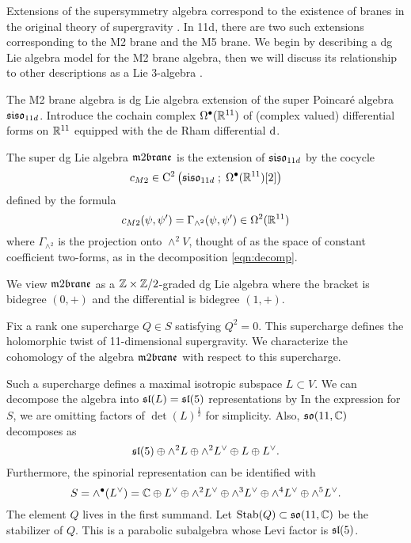 \documentclass[11pt]{amsart}
\begin{document}
Extensions of the supersymmetry algebra correspond to the existence of branes in the original theory of supergravity . 
In 11d, there are two such extensions corresponding to the M2 brane and the M5 brane.
We begin by describing a dg Lie algebra model for the M2 brane algebra, then we will discuss its relationship to other descriptions as a Lie 3-algebra \cite{Basu_2005,Bagger_2007,fiorenza2015super}. 

The M2 brane algebra is dg Lie algebra extension of the super Poincar\'e algebra $\mathfrak{siso}_{11d}$.
Introduce the cochain complex $\Omega^{\bullet}(\mathbb R^{11})$ of (complex valued) differential forms on $\mathbb R^{11}$ equipped with the de Rham differential ${\rm d}$.  
 
The super dg Lie algebra $\m2$ is the extension of $\mathfrak{siso}_{11d}$ by the cocycle
  \[
    c_{M2} \in {\rm C}^2\left(\mathfrak{siso}_{11d} \; ; \; \Omega^\bullet (\mathbb R^{11})[2]\right)
  \]
  defined by the formula 
  \[c_{M2} (\psi, \psi') = \Gamma_{\wedge^2}(\psi, \psi') \in \Omega^2(\mathbb R^{11})\]
  where $\Gamma_{\wedge^2}$ is the projection onto $\wedge^2 V$, thought of as the space of constant coefficient two-forms, as in the decomposition \eqref{eqn:decomp}.

We view $\m2$ as a $\mathbb Z \times \mathbb Z/2$-graded dg Lie algebra where the bracket is bidegree $(0,+)$ and the differential is bidegree $(1,+)$.


Fix a rank one supercharge $Q \in S$ satisfying $Q^2 = 0$.
This supercharge defines the holomorphic twist of 11-dimensional supergravity. 
We characterize the cohomology of the algebra $\m2$ with respect to this supercharge. 

Such a supercharge defines a maximal isotropic subspace $L \subset V$. 
We can decompose the algebra into $\mathfrak{sl}(L) = \mathfrak{sl}(5)$ representations by
In the expression for $S$, we are omitting factors of $\det(L)^{\frac12}$ for simplicity. 
Also, $\mathfrak{so}(11, \mathbb C)$ decomposes as
\[
\mathfrak{sl}(5) \oplus \wedge^2 L \oplus \wedge^2 L^\vee \oplus L \oplus L^\vee .
\]
Furthermore, the spinorial representation can be identified with
\[
S = \wedge^\bullet (L^\vee) = \mathbb C \oplus L^\vee \oplus \wedge^2 L^\vee \oplus \wedge^3 L^\vee \oplus \wedge^4 L^\vee \oplus \wedge^5 L^\vee .
\]
The element $Q$ lives in the first summand.
Let ${\rm Stab}(Q) \subset \mathfrak{so}(11,\mathbb C)$ be the stabilizer of $Q$. 
This is a parabolic subalgebra whose Levi factor is $\mathfrak{sl}(5)$.
\end{document}
